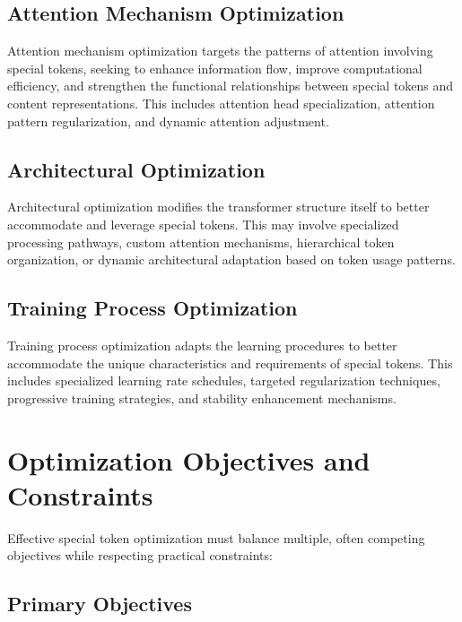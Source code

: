 \subsection{Attention Mechanism Optimization}

Attention mechanism optimization targets the patterns of attention involving special tokens, seeking to enhance information flow, improve computational efficiency, and strengthen the functional relationships between special tokens and content representations. This includes attention head specialization, attention pattern regularization, and dynamic attention adjustment.

\subsection{Architectural Optimization}

Architectural optimization modifies the transformer structure itself to better accommodate and leverage special tokens. This may involve specialized processing pathways, custom attention mechanisms, hierarchical token organization, or dynamic architectural adaptation based on token usage patterns.

\subsection{Training Process Optimization}

Training process optimization adapts the learning procedures to better accommodate the unique characteristics and requirements of special tokens. This includes specialized learning rate schedules, targeted regularization techniques, progressive training strategies, and stability enhancement mechanisms.

\section{Optimization Objectives and Constraints}

Effective special token optimization must balance multiple, often competing objectives while respecting practical constraints:

\subsection{Primary Objectives}

